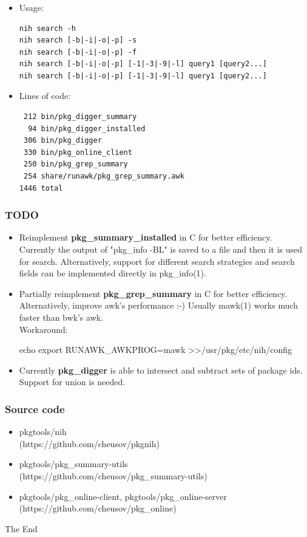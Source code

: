 \documentclass[hyperref=unicode,ascii,xcolor=dvipsnames]{beamer}
\begin{document}
\begin{frame}[fragile]
  \frametitle{}
  \small
  \begin{itemize}
  \item Usage:
\begin{verbatim}
nih search -h
nih search [-b|-i|-o|-p] -s
nih search [-b|-i|-o|-p] -f
nih search [-b|-i|-o|-p] [-1|-3|-9|-l] query1 [query2...]
nih search [-b|-i|-o|-p] [-1|-3|-9|-l] query1 [query2...]
\end{verbatim}
\item Lines of code:
\begin{verbatim}
 212 bin/pkg_digger_summary
  94 bin/pkg_digger_installed
 306 bin/pkg_digger
 330 bin/pkg_online_client
 250 bin/pkg_grep_summary
 254 share/runawk/pkg_grep_summary.awk
1446 total
\end{verbatim}
  \end{itemize}
\end{frame}

\begin{frame}[fragile]
  \frametitle{TODO}
  \begin{itemize}
  \item Reimplement {\bf pkg\_summary\_installed} in C for better efficiency.
Currently the output of "pkg\_info -BL" is saved to a file and then it is used for search.
Alternatively, support for different search strategies and search fields
can be implemented directly in pkg\_info(1).
  \item Partially reimplement {\bf pkg\_grep\_summary} in C for better efficiency.
Alternatively, improve awk's performance :-) Usually mawk(1) works much faster
than bwk's awk.\\
{\footnotesize Workaround:}\\
\begin{CodeNoLabelSmallest}
echo export RUNAWK\_AWKPROG=mawk \textgreater\textgreater /usr/pkg/etc/nih/config
\end{CodeNoLabelSmallest}
  \item Currently {\bf pkg\_digger} is able to intersect and subtract sets of package ids.
    Support for union is needed.
  \end{itemize}
\end{frame}

\begin{frame}[fragile]
  \frametitle{Source code}
  \begin{itemize}
  \item pkgtools/nih\\
    (https://github.com/cheusov/pkgnih)
  \item pkgtools/pkg\_summary-utils\\
    (https://github.com/cheusov/pkg\_summary-utils)
  \item pkgtools/pkg\_online-client, pkgtools/pkg\_online-server\\
    (https://github.com/cheusov/pkg\_online)
  \end{itemize}
  \begin{center}
    \Huge{The End}
  \end{center}
\end{frame}

\end{document}
